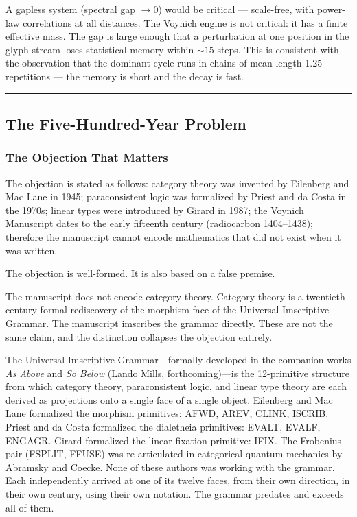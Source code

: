 \documentclass[12pt,a4paper]{article}
\begin{document}
A gapless system (spectral gap $\to 0$) would be critical --- scale-free, with power-law correlations at all distances. The Voynich engine is not critical: it has a finite effective mass. The gap is large enough that a perturbation at one position in the glyph stream loses statistical memory within $\sim 15$ steps. This is consistent with the observation that the dominant cycle runs in chains of mean length 1.25 repetitions --- the memory is short and the decay is fast.

\begin{center}
\rule{0.5\textwidth}{0.4pt}
\end{center}

\subsection{The Five-Hundred-Year Problem}

\subsubsection{The Objection That Matters}

The objection is stated as follows: category theory was invented by Eilenberg and Mac Lane in 1945; paraconsistent logic was formalized by Priest and da Costa in the 1970s; linear types were introduced by Girard in 1987; the Voynich Manuscript dates to the early fifteenth century (radiocarbon 1404--1438); therefore the manuscript cannot encode mathematics that did not exist when it was written.

The objection is well-formed. It is also based on a false premise.

The manuscript does not encode category theory. Category theory is a twentieth-century formal rediscovery of the morphism face of the Universal Imscriptive Grammar. The manuscript imscribes the grammar directly. These are not the same claim, and the distinction collapses the objection entirely.

The Universal Imscriptive Grammar---formally developed in the companion works \emph{As Above} and \emph{So Below} (Lando Mills, forthcoming)---is the 12-primitive structure from which category theory, paraconsistent logic, and linear type theory are each derived as projections onto a single face of a single object. Eilenberg and Mac Lane formalized the morphism primitives: AFWD, AREV, CLINK, ISCRIB. Priest and da Costa formalized the dialetheia primitives: EVALT, EVALF, ENGAGR. Girard formalized the linear fixation primitive: IFIX. The Frobenius pair (FSPLIT, FFUSE) was re-articulated in categorical quantum mechanics by Abramsky and Coecke. None of these authors was working with the grammar. Each independently arrived at one of its twelve faces, from their own direction, in their own century, using their own notation. The grammar predates and exceeds all of them.
\end{document}
